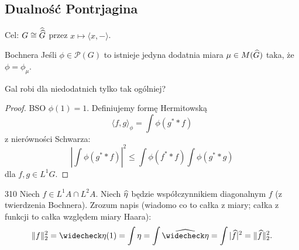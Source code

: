 \subsection{Dualność Pontrjagina}

Cel: $G\cong \Hat{\Hat{G}}$ przez $x\mapsto \langle x, -\rangle$.

\begin{theorem}{Bochnera}{}
  Jeśli $\phi\in\mathcal{P}(G)$ to istnieje jedyna dodatnia miara $\mu\in M(\Hat{G})$ taka, że $\phi=\phi_\mu$.

  \color{red}Gal robi dla niedodatnich tylko tak ogólniej?
\end{theorem}

\begin{proof}
  BSO $\phi(1)=1$. Definiujemy formę Hermitowską
  $$\langle f,g\rangle_\phi=\int\phi(g^*\ast f)$$
  z nierówności Schwarza:
  $$\left|\int\phi(g^*\ast f)\right|^2\leq \int \phi(f^*\ast f)\int \phi(g^*\ast g)$$
  dla $f,g\in L^1G$.
\end{proof}

\begin{zadanie}{3}{10}
  Niech $f\in L^1A\cap L^2A$. Niech $\Hat{\eta}$ będzie współczynnikiem diagonalnym $f$ (z twierdzenia Bochnera). Zrozum napis (wiadomo co to całka z miary; całka z funkcji to całka względem miary Haara):
  $$\|f\|_2^2=\taH{\eta}(1)=\int\eta=\int\Hat{\taH{\eta}}=\int|\Hat{f}|^2=\|\Hat{f}\|^2_2.$$
\end{zadanie}

